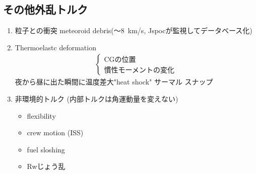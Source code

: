 \documentclass[class=article, crop=false, dvipdfmx, fleqn]{standalone}
\begin{document}
\subsection{その他外乱トルク}
\begin{enumerate}[label = \maru{\theenumi}]
\item 粒子との衝突 meteoroid debris(～\SI{8}{km/s}, Jspocが監視してデータベース化)
\item Thermoelastc deformation
\begin{align}
\begin{cases}
\text{CGの位置} \\
\text{慣性モーメントの変化}
\end{cases}
\end{align}
夜から昼に出た瞬間に温度差大"heat shock" サーマル
スナップ
\item 非環境的トルク
(内部トルクは角運動量を変えない)
\begin{itemize}
\item flexibility
\item crew motion (ISS)
\item fuel sloshing
\item Rwじょう乱
\end{itemize}
\end{enumerate}
\end{document}
